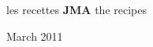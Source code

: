 \documentclass[12 pt]{report}
\begin{document}
\thispagestyle{empty}

\Huge\center
\vspace*{.2\textheight}
\Large{les recettes}
\qquad
{\bf JMA}
\qquad
\Large{the recipes}

\vspace*{.4\textheight}

\large\rm
March 2011
\end{document}
